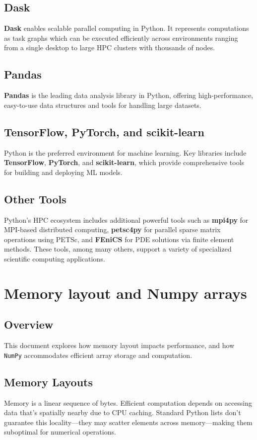 \documentclass{book}
\begin{document}
\section{Dask}
\textbf{Dask} enables scalable parallel computing in Python. It represents computations as task graphs which can be executed efficiently across environments ranging from a single desktop to large HPC clusters with thousands of nodes.

\section{Pandas}
\textbf{Pandas} is the leading data analysis library in Python, offering high-performance, easy-to-use data structures and tools for handling large datasets.

\section{TensorFlow, PyTorch, and scikit-learn}
Python is the preferred environment for machine learning. Key libraries include \textbf{TensorFlow}, \textbf{PyTorch}, and \textbf{scikit-learn}, which provide comprehensive tools for building and deploying ML models.

\section{Other Tools}
Python’s HPC ecosystem includes additional powerful tools such as \textbf{mpi4py} for MPI-based distributed computing, \textbf{petsc4py} for parallel sparse matrix operations using PETSc, and \textbf{FEniCS} for PDE solutions via finite element methods. These tools, among many others, support a variety of specialized scientific computing applications.

\chapter{Memory layout and Numpy arrays}

\section*{Overview}
This document explores how memory layout impacts performance, and how \texttt{NumPy} accommodates efficient array storage and computation.

\section{Memory Layouts}
Memory is a linear sequence of bytes. Efficient computation depends on accessing data that's spatially nearby due to CPU caching. Standard Python lists don't guarantee this locality—they may scatter elements across memory—making them suboptimal for numerical operations.
\end{document}
